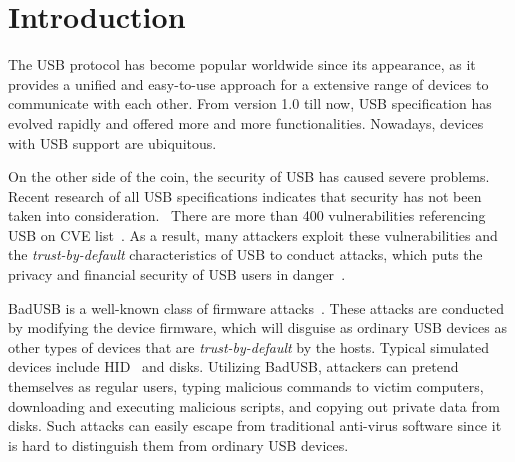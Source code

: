 \section{Introduction}
\label{sec:introduction}

The \ac{USB} protocol has become popular worldwide
since its appearance, as it provides a unified and easy-to-use approach for a
extensive range of devices to communicate with each other.  From version 1.0 till
now, \ac{USB} specification has evolved rapidly and offered more and more
functionalities.  Nowadays, devices with \ac{USB} support are ubiquitous.

On the other side of the coin, the security of \ac{USB} has caused severe problems.
Recent research of all USB specifications indicates that security has not been taken into consideration.~\cite{sok}  There are more than 400
vulnerabilities referencing \ac{USB} on CVE list~\cite{website:CVE-list}.  As a
result, many attackers exploit these vulnerabilities and the
\textit{trust-by-default} characteristics of \ac{USB} to conduct attacks, which puts
the privacy and financial security of \ac{USB} users in danger~\cite{sok}.

BadUSB is a well-known class of firmware attacks~\cite{badusb}.  These attacks
are conducted by modifying the device firmware, which will disguise
 as ordinary \ac{USB} devices as other types of devices that are \textit{trust-by-default}
by the hosts.  Typical simulated devices include \ac{HID}~\cite{hid} and disks.  Utilizing BadUSB,
attackers can pretend themselves as regular users, typing malicious commands to
victim computers, downloading and executing malicious scripts, and copying out
private data from disks.  Such attacks can easily escape from traditional
anti-virus software since it is hard to distinguish them from ordinary \ac{USB}
devices.

